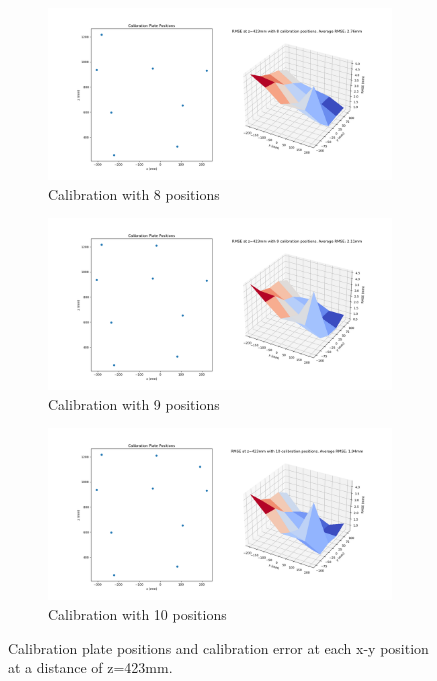 \begin{figure}
    \begin{subfigure}[b]{.45\linewidth}
        \includegraphics[width=\linewidth]{bilder/project/calibration_result_figures/calibration_accuracy_423mm_iter8.png}
        \caption{Calibration with 8 positions}\label{fig:423mm_iter8}
    \end{subfigure}
    \begin{subfigure}[b]{.45\linewidth}
        \includegraphics[width=\linewidth]{bilder/project/calibration_result_figures/calibration_accuracy_423mm_iter9.png}
        \caption{Calibration with 9 positions}\label{fig:423mm_iter9}
    \end{subfigure}

    \begin{subfigure}[b]{.45\linewidth}
        \includegraphics[width=\linewidth]{bilder/project/calibration_result_figures/calibration_accuracy_423mm_iter10.png}
        \caption{Calibration with 10 positions}\label{fig:423mm_iter10}
    \end{subfigure}
    
    \caption{Calibration plate positions and calibration error at each x-y position at a distance of z=423mm.}
    \label{fig:calibration_results_423mm}
\end{figure}


